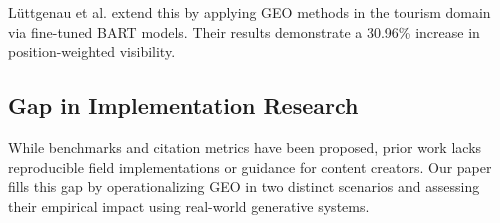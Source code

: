 L\"uttgenau et al. \cite{luttgenau2025beyondseo} extend this by applying GEO methods in the tourism domain via fine-tuned BART models. Their results demonstrate a 30.96\% increase in position-weighted visibility.

\subsection{Gap in Implementation Research}

While benchmarks and citation metrics have been proposed, prior work lacks reproducible field implementations or guidance for content creators. Our paper fills this gap by operationalizing GEO in two distinct scenarios and assessing their empirical impact using real-world generative systems.
